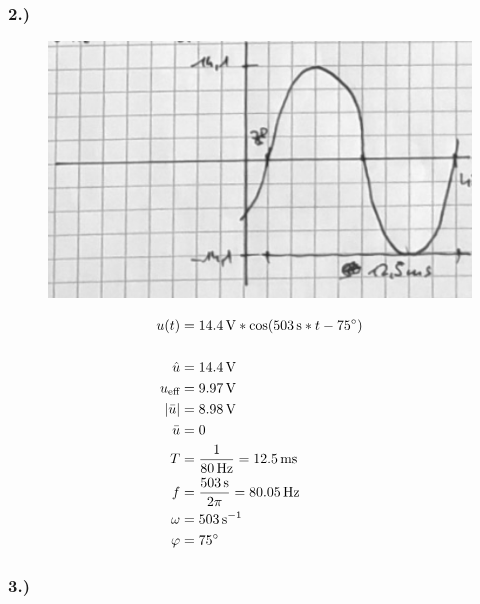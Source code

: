 \documentclass[../../document.tex]{subfiles}
\begin{document}
\newpage

\subsubsection*{2.)}

\begin{figure}[H]
    \begin{center}
        \includegraphics[width=.9\linewidth]{../../img/aufg1-a-2}
    \end{center}
\end{figure}

\begin{equation*}
    \begin{split}
        u(t) &= \SI{14,4}{\volt} * \cos(\SI{503}{\second} * t - \SI{75}{\degree})\\\\
        \hat{u} &= \SI{14,4}{\volt}\\
        u_{\textrm{eff}} &= \SI{9,97}{\volt}\\
        \left\lvert\bar{u}\right\rvert &= \SI{8,98}{\volt}\\
        \bar{u} &= 0\\
        T &= \frac{1}{\SI{80}{\hertz}} = \SI{12,5}{ms}\\
        f &= \frac{\SI{503}{\second}}{2\pi} = \SI{80,05}{\hertz}\\
        \omega &= \SI{503}{\second^{-1}}\\
        \varphi &= \SI{75}{\degree}\\
    \end{split}
\end{equation*}

\newpage

\subsubsection*{3.)}
\end{document}
